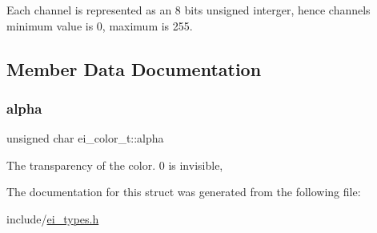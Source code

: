 Each channel is represented as an 8 bits unsigned interger, hence channel\textquotesingle{}s minimum value is 0, maximum is 255. 

\subsection{Member Data Documentation}
\mbox{\label{structei__color__t_af213a14356db920b1a04f5270263ae61}} 
\subsubsection{\texorpdfstring{alpha}{alpha}}
{\footnotesize\ttfamily unsigned char ei\+\_\+color\+\_\+t\+::alpha}

The transparency of the color. 0 is invisible, 

The documentation for this struct was generated from the following file\+:\begin{DoxyCompactItemize}
\item 
include/\hyperlink{ei__types_8h}{ei\+\_\+types.\+h}\end{DoxyCompactItemize}
